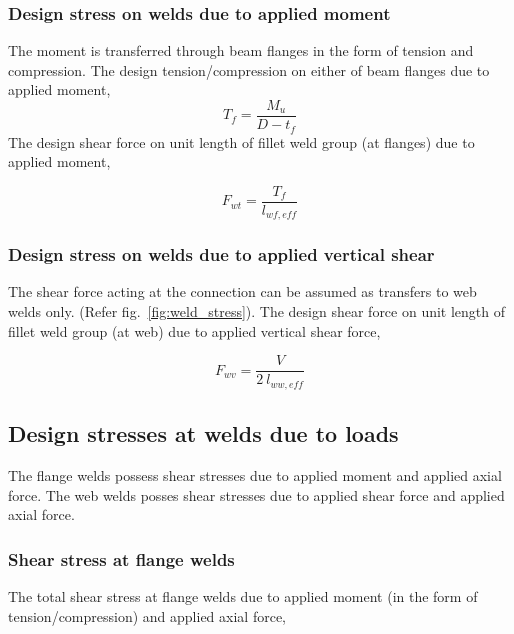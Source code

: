 \documentclass[11.5pt,a4paper,oneside]{report}
\begin{document}
\begin{Form}
\subsubsection{Design stress on welds due to applied moment}

The moment is transferred through beam flanges in the form of tension and compression.
The design tension/compression on either of beam flanges due to applied moment,
\begin{equation}
	T_{f} = \frac{M_u}{D - t_f}
\end{equation}
The design shear force on unit length of fillet weld group (at flanges) due to applied moment,

\begin{equation}
	F_{wt} = \frac{T_{f}}{l_{wf,eff}}
\end{equation}

\subsubsection{Design stress on welds due to applied vertical shear}
The shear force acting at the connection can be assumed as transfers to web welds only. (Refer fig.~\ref{fig:weld_stress}).
The design shear force on unit length of fillet weld group (at web) due to applied vertical shear force,

\begin{equation}
	F_{wv} = \frac{V}{2~l_{ww,eff}}
\end{equation}


\subsection{Design stresses at welds due to loads}

The flange welds possess shear stresses due to applied moment and applied axial force.
The web welds posses shear stresses due to applied shear force and applied axial force.

\subsubsection{Shear stress at flange welds}
The total shear stress at flange welds due to applied moment (in the form of tension/compression)
and applied axial force,



\end{Form}
\end{document}
